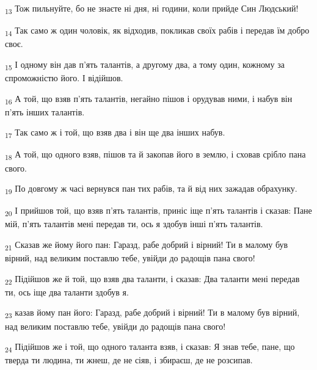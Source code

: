 \begin{tcolorbox}
\textsubscript{13} Тож пильнуйте, бо не знаєте ні дня, ні години, коли прийде Син Людський!
\end{tcolorbox}
\begin{tcolorbox}
\textsubscript{14} Так само ж один чоловік, як відходив, покликав своїх рабів і передав їм добро своє.
\end{tcolorbox}
\begin{tcolorbox}
\textsubscript{15} І одному він дав п'ять талантів, а другому два, а тому один, кожному за спроможністю його. І відійшов.
\end{tcolorbox}
\begin{tcolorbox}
\textsubscript{16} А той, що взяв п'ять талантів, негайно пішов і орудував ними, і набув він п'ять інших талантів.
\end{tcolorbox}
\begin{tcolorbox}
\textsubscript{17} Так само ж і той, що взяв два і він ще два інших набув.
\end{tcolorbox}
\begin{tcolorbox}
\textsubscript{18} А той, що одного взяв, пішов та й закопав його в землю, і сховав срібло пана свого.
\end{tcolorbox}
\begin{tcolorbox}
\textsubscript{19} По довгому ж часі вернувся пан тих рабів, та й від них зажадав обрахунку.
\end{tcolorbox}
\begin{tcolorbox}
\textsubscript{20} І прийшов той, що взяв п'ять талантів, приніс іще п'ять талантів і сказав: Пане мій, п'ять талантів мені передав ти, ось я здобув інші п'ять талантів.
\end{tcolorbox}
\begin{tcolorbox}
\textsubscript{21} Сказав же йому його пан: Гаразд, рабе добрий і вірний! Ти в малому був вірний, над великим поставлю тебе, увійди до радощів пана свого!
\end{tcolorbox}
\begin{tcolorbox}
\textsubscript{22} Підійшов же й той, що взяв два таланти, і сказав: Два таланти мені передав ти, ось іще два таланти здобув я.
\end{tcolorbox}
\begin{tcolorbox}
\textsubscript{23} казав йому пан його: Гаразд, рабе добрий і вірний! Ти в малому був вірний, над великим поставлю тебе, увійди до радощів пана свого!
\end{tcolorbox}
\begin{tcolorbox}
\textsubscript{24} Підійшов же і той, що одного таланта взяв, і сказав: Я знав тебе, пане, що тверда ти людина, ти жнеш, де не сіяв, і збираєш, де не розсипав.
\end{tcolorbox}
